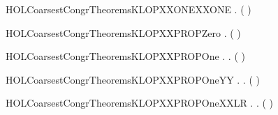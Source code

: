 \newcommand{\HOLCoarsestCongrTheoremsKLOPXXLEMMAXXFINITE}{\UseVerbatim{HOLCoarsestCongrTheoremsKLOPXXLEMMAXXFINITE}}
\begin{SaveVerbatim}{HOLCoarsestCongrTheoremsKLOPXXONEXXONE}
\HOLTokenTurnstile{} \HOLSymConst{\HOLTokenForall{}}.  ( )
\end{SaveVerbatim}
\newcommand{\HOLCoarsestCongrTheoremsKLOPXXONEXXONE}{\UseVerbatim{HOLCoarsestCongrTheoremsKLOPXXONEXXONE}}
\begin{SaveVerbatim}{HOLCoarsestCongrTheoremsKLOPXXPROPZero}
\HOLTokenTurnstile{} \HOLSymConst{\HOLTokenForall{}} .  (  )
\end{SaveVerbatim}
\newcommand{\HOLCoarsestCongrTheoremsKLOPXXPROPZero}{\UseVerbatim{HOLCoarsestCongrTheoremsKLOPXXPROPZero}}
\begin{SaveVerbatim}{HOLCoarsestCongrTheoremsKLOPXXPROPOne}
\HOLTokenTurnstile{} \HOLSymConst{\HOLTokenForall{}}  .    \HOLTokenTransBegin{} \HOLTokenTransEnd {} \HOLSymConst{\HOLTokenEquiv{}} \HOLSymConst{\HOLTokenExists{}}.  \HOLSymConst{\HOLTokenLt{}}  \HOLSymConst{\HOLTokenConj{}} ( \HOLSymConst{=}   )
\end{SaveVerbatim}
\newcommand{\HOLCoarsestCongrTheoremsKLOPXXPROPOne}{\UseVerbatim{HOLCoarsestCongrTheoremsKLOPXXPROPOne}}
\begin{SaveVerbatim}{HOLCoarsestCongrTheoremsKLOPXXPROPOneYY}
\HOLTokenTurnstile{} \HOLSymConst{\HOLTokenForall{}}  .    \HOLTokenWeakTransBegin{} \HOLTokenImp{}  \HOLSymConst{\HOLTokenEquiv{}} \HOLSymConst{\HOLTokenExists{}}.  \HOLSymConst{\HOLTokenLt{}}  \HOLSymConst{\HOLTokenConj{}} ( \HOLSymConst{=}   )
\end{SaveVerbatim}
\newcommand{\HOLCoarsestCongrTheoremsKLOPXXPROPOneYY}{\UseVerbatim{HOLCoarsestCongrTheoremsKLOPXXPROPOneYY}}
\begin{SaveVerbatim}{HOLCoarsestCongrTheoremsKLOPXXPROPOneXXLR}
\HOLTokenTurnstile{} \HOLSymConst{\HOLTokenForall{}}  .    \HOLTokenTransBegin{} \HOLTokenTransEnd {} \HOLSymConst{\HOLTokenImp{}} \HOLSymConst{\HOLTokenExists{}}.  \HOLSymConst{\HOLTokenLt{}}  \HOLSymConst{\HOLTokenConj{}} ( \HOLSymConst{=}   )
\end{SaveVerbatim}
